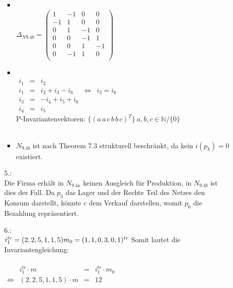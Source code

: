 \documentclass[a4paper,11pt,fleqn]{scrartcl}
\begin{document}
\begin{enumerate}
\begin{enumerate}
\begin{itemize}
				\item \quad \\
				\( \Delta_{N9.4b} =
			\begin{pmatrix}
				1 & -1 & 0 & 0 \\
				-1 & 1 & 0 & 0 \\
				0 & 1 & -1 & 0 \\
				0 & 0 & -1 & 1 \\
				0 & 0 & 1 & -1 \\
				0 & -1 & 1 & 0 \\
			\end{pmatrix}
			\) \\
			\item \quad \\
			\(\begin{array}{rclcl}
				i_1 &=& i_2 \\
				i_1 &=& i_2 + i_3 - i_6 &\Leftrightarrow & i_3 = i_6 \\
				i_3 &=& -i_4 + i_5 + i_6 \\
				i_4 &=& i_5
			\end{array}
			\) \\
			P-Invariantenvektoren: \(\Big\{(a\,a\,c\,b\,b\,c)^T\Big\}\ a,b,c\in\mathbb{N}/\{0\}\) \\ \\
			\item \(N_{9.4b}\) ist nach Theorem 7.3 strukturell beschränkt, da kein \(i(p_k) = 0\) existiert. \\
			
			\end{itemize}
			\item[5.:]\quad \\
			Die Firma erhält in \(N_{9.4a}\) keinen Ausgleich für Produktion, in \(N_{9.4b}\) ist dies der Fall.
			Da \(p_3\) das Lager und der Rechte Teil des Netzes den Konsum darstellt, könnte \(c\) dem Verkauf 
			darstellen, womit \(p_6\) die Bezahlung repräsentiert.
			\item[6.:]\quad \\
			\(
				i_1^{tr} = (2,2,5,1,1,5) \\
				m_0 = (1,1,0,3,0,1)^{tr} \\
				\\
			\)
			Somit lautet die Invariantengleichung: \\
			\\
			\(
			\begin{array}{crcr}
				& i_1^{tr} \cdot m &=& i_1^{tr} \cdot m_0 \\
				\Leftrightarrow & (2,2,5,1,1,5) \cdot m &=& 12
			\end{array}
			\)
		\end{enumerate}
	\end{enumerate}
\end{document}
